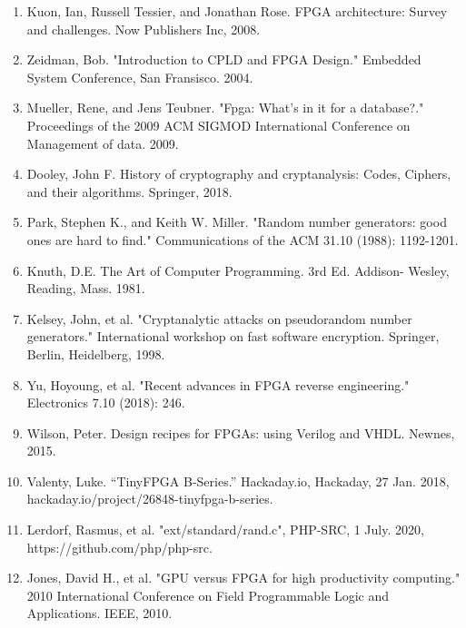 \documentclass{article}
\begin{document}
    \begin{enumerate}

    \item Kuon, Ian, Russell Tessier, and Jonathan Rose. FPGA architecture: Survey and challenges. Now Publishers Inc, 2008.
    \item Zeidman, Bob. "Introduction to CPLD and FPGA Design." Embedded System Conference, San Fransisco. 2004.
    \item Mueller, Rene, and Jens Teubner. "Fpga: What's in it for a database?." Proceedings of the 2009 ACM SIGMOD International Conference on Management of data. 2009.
    \item Dooley, John F. History of cryptography and cryptanalysis: Codes, Ciphers, and their algorithms. Springer, 2018.
    \item Park, Stephen K., and Keith W. Miller. "Random number generators: good ones are hard to find." Communications of the ACM 31.10 (1988): 1192-1201.
    \item Knuth, D.E. The Art of Computer Programming. 3rd Ed. Addison- Wesley, Reading, Mass. 1981.
    \item Kelsey, John, et al. "Cryptanalytic attacks on pseudorandom number generators." International workshop on fast software encryption. Springer, Berlin, Heidelberg, 1998.
    \item Yu, Hoyoung, et al. "Recent advances in FPGA reverse engineering." Electronics 7.10 (2018): 246.
    \item Wilson, Peter. Design recipes for FPGAs: using Verilog and VHDL. Newnes, 2015.
    \item Valenty, Luke. “TinyFPGA B-Series.” Hackaday.io, Hackaday, 27 Jan. 2018, hackaday.io/project/26848-tinyfpga-b-series.
    \item Lerdorf, Rasmus, et al. "ext/standard/rand.c", PHP-SRC, 1 July. 2020, https://github.com/php/php-src.
    \item Jones, David H., et al. "GPU versus FPGA for high productivity computing." 2010 International Conference on Field Programmable Logic and Applications. IEEE, 2010.

    \end{enumerate}
    
\end{document}
